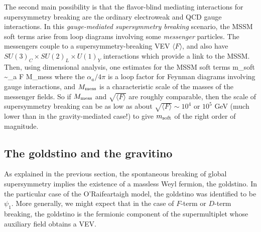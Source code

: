 The second main possibility is that the flavor-blind mediating
interactions
for supersymmetry breaking are the ordinary electroweak and
QCD gauge
interactions.
In this {\it gauge-mediated supersymmetry breaking} 
scenario, the MSSM soft terms
arise from loop diagrams involving
some {\it messenger} particles. 
The messengers 
couple to a supersymmetry-breaking VEV $\langle F\rangle$, and also
have $SU(3)_C \times SU(2)_L \times U(1)_Y$ interactions
which provide a link to the MSSM.
Then, using dimensional analysis, one estimates for the
MSSM soft terms
\beq
m_{\rm soft} \sim {\alpha_a\pi} {\langle F \rangle
\over
M_{\rm mess}}
\label{mgravgmsb}
\eeq
where the $\alpha_a/4\pi$ is a loop factor for Feynman diagrams
involving gauge interactions, and $M_{\rm mess}$ is a characteristic
scale of the masses of the messenger fields.
So if $M_{\rm mess}$ and $\sqrt{\langle F\rangle}$ are roughly comparable,
then
the scale of
supersymmetry
breaking can be as low as about ${\sqrt{\langle F\rangle}} \sim 10^4$
or $10^5$ GeV
(much lower than in the gravity-mediated case!)
to give $m_{\rm soft}$ of the right order of magnitude.

\subsection{The goldstino and the gravitino}\label{subsec:origins.gravitino}

As explained in the previous section,
the spontaneous breaking of global supersymmetry implies the existence
of a massless Weyl fermion, the goldstino.
In the particular case of the O'Rai\-f\-ear\-taigh model,
the goldstino was identified to be $\psi_1$. More generally, we might
expect that in the case of
$F$-term or $D$-term breaking, the goldstino is the fermionic component
of the supermultiplet whose auxiliary field obtains a VEV.

